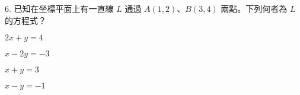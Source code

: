 \documentclass[12pt]{article}
\begin{document}
\begin{problem}
  \item[6.] 已知在坐標平面上有一直線 $L$ 通過 $A(1,2)$、$B(3,4)$ 兩點。下列何者為 $L$ 的方程式？
  \begin{choices}
    \item $2x + y = 4$
    \item $x - 2y = -3$
    \item $x + y = 3$
    \item $x - y = -1$
  \end{choices}
\end{problem}
\end{document}
